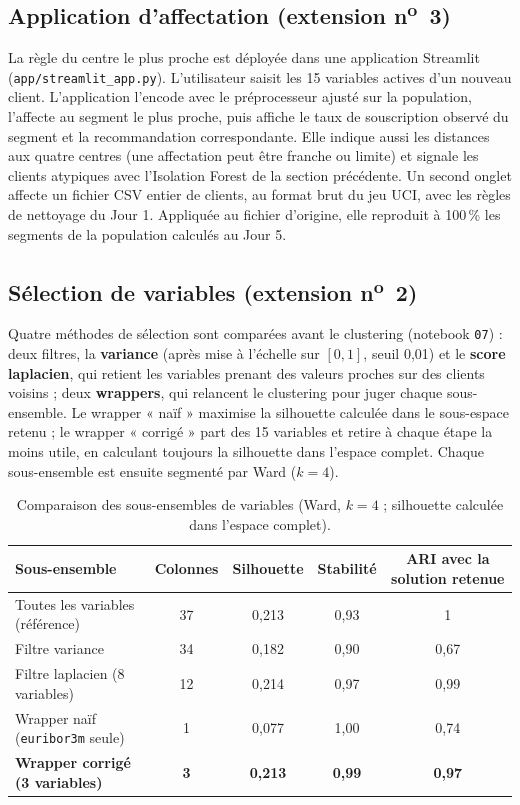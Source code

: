 \documentclass[11pt,a4paper]{article}
\begin{document}
\subsection{Application d'affectation (extension n\textsuperscript{o}~3)}
La règle du centre le plus proche est déployée dans une application Streamlit (\texttt{app/streamlit\_app.py}). L'utilisateur saisit les 15 variables actives d'un nouveau client. L'application l'encode avec le préprocesseur ajusté sur la population, l'affecte au segment le plus proche, puis affiche le taux de souscription observé du segment et la recommandation correspondante. Elle indique aussi les distances aux quatre centres (une affectation peut être franche ou limite) et signale les clients atypiques avec l'Isolation Forest de la section précédente. Un second onglet affecte un fichier CSV entier de clients, au format brut du jeu UCI, avec les règles de nettoyage du Jour 1. Appliquée au fichier d'origine, elle reproduit à 100\,\% les segments de la population calculés au Jour 5.

\subsection{Sélection de variables (extension n\textsuperscript{o}~2)}
Quatre méthodes de sélection sont comparées avant le clustering (notebook \texttt{07}) : deux filtres, la \textbf{variance} (après mise à l'échelle sur $[0,1]$, seuil 0,01) et le \textbf{score laplacien}, qui retient les variables prenant des valeurs proches sur des clients voisins ; deux \textbf{wrappers}, qui relancent le clustering pour juger chaque sous-ensemble. Le wrapper « naïf » maximise la silhouette calculée dans le sous-espace retenu ; le wrapper « corrigé » part des 15 variables et retire à chaque étape la moins utile, en calculant toujours la silhouette dans l'espace complet. Chaque sous-ensemble est ensuite segmenté par Ward ($k=4$).

\begin{table}[H]\centering\small
\caption{Comparaison des sous-ensembles de variables (Ward, $k=4$ ; silhouette calculée dans l'espace complet).}\label{tab:selection}
\begin{tabular}{|l|c|c|c|c|}
\hline
\textbf{Sous-ensemble} & \textbf{Colonnes} & \textbf{Silhouette} & \textbf{Stabilité} & \textbf{ARI avec la solution retenue}\\ \hline
Toutes les variables (référence) & 37 & 0,213 & 0,93 & 1\\ \hline
Filtre variance & 34 & 0,182 & 0,90 & 0,67\\ \hline
Filtre laplacien (8 variables) & 12 & 0,214 & 0,97 & 0,99\\ \hline
Wrapper naïf (\texttt{euribor3m} seule) & 1 & 0,077 & 1,00 & 0,74\\ \hline
\textbf{Wrapper corrigé (3 variables)} & \textbf{3} & \textbf{0,213} & \textbf{0,99} & \textbf{0,97}\\ \hline
\end{tabular}
\end{table}
\end{document}
